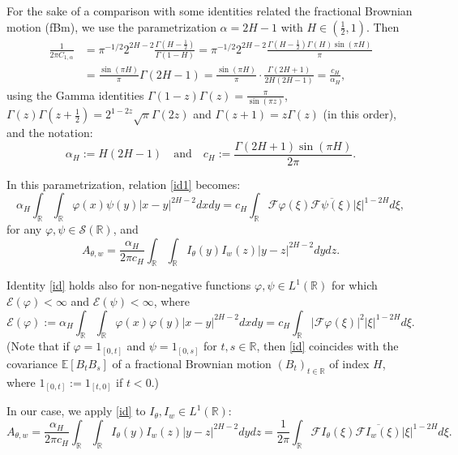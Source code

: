 \documentclass[12pt]{article}
\def\cE{\mathcal{E}}
\def\cF{\mathcal{F}}
\def\cS{\mathcal{S}}
\def\bE{\mathbb{E}}
\def\bR{\mathbb{R}}
\begin{document}
For the sake of a comparison with some identities related the fractional Brownian motion (fBm), we use the parametrization $\alpha=2H-1$ with $H \in (\frac{1}{2},1)$. 
Then 
\begin{align*}
\frac{1}{2\pi C_{1,\alpha}}&= %
\pi^{-1/2} 2^{2H-2}\frac{\Gamma(H-\frac{1}{2})}{\Gamma(1-H)}=\pi^{-1/2} 2^{2H-2}\frac{\Gamma(H-\frac{1}{2})\Gamma(H)\sin(\pi H)}{\pi}\\
&= \frac{\sin(\pi H)}{\pi}\Gamma(2H-1)=\frac{\sin(\pi H)}{\pi}\cdot \frac{\Gamma(2H+1)}{2H(2H-1)}=\frac{c_H}{\alpha_H},
\end{align*}
using the Gamma identities
$\Gamma(1-z)\Gamma(z)=\frac{\pi}{\sin(\pi z)}$, $\Gamma(z) \Gamma(z+\frac{1}{2})=2^{1-2z}\sqrt{\pi}\Gamma(2z)$ and
$\Gamma(z+1)=z\Gamma(z)$ (in this order), and the notation:
\[
\alpha_{H}:=H(2H-1) \quad \mbox{and} \quad c_H:=\frac{\Gamma(2H+1)\sin(\pi H)}{2\pi}.
\]

In this parametrization, relation \eqref{id1} becomes: 
\begin{equation}
\label{id}
\alpha_H \int_{\bR} \int_{\bR}\varphi(x)\psi(y)|x-y|^{2H-2}dxdy=c_H \int_{\bR}\cF \varphi(\xi)\overline{\cF \psi(\xi)}|\xi|^{1-2H}d\xi,
\end{equation}
for any $\varphi,\psi \in \cS(\bR)$, and
\[
A_{\theta,w}=\frac{\alpha_H}{2\pi c_H}\int_{\bR}\int_{\bR}I_{\theta}(y) I_{w}(z)|y-z|^{2H-2}dydz.
\]


Identity \eqref{id} holds also for non-negative functions $\varphi,\psi \in L^1(\bR)$ for which $\cE(\varphi)<\infty$ and $\cE(\psi)<\infty$, where
\[
\cE(\varphi):=\alpha_H\int_{\bR}\int_{\bR} \varphi(x) \varphi(y)|x-y|^{2H-2}dxdy=c_H \int_{\bR}|\cF \varphi (\xi)|^2 |\xi|^{1-2H}d\xi.
\]
(Note that if $\varphi=1_{[0,t]}$ and $\psi=1_{[0,s]}$ for $t,s\in \bR$, then \eqref{id} coincides with the covariance $\bE[B_t B_s]$ of a fractional Brownian motion $(B_t)_{t\in \bR}$ of index $H$, where $1_{[0,t]}:=1_{[t,0]}$ if $t<0$.)

\medskip

In our case, we apply \eqref{id} to $I_{\theta},I_{w} \in L^1(\bR)$:
\[
A_{\theta,w}=\frac{\alpha_H}{2\pi c_H}\int_{\bR}\int_{\bR} I_{\theta}(y)I_{w}(z)|y-z|^{2H-2} dydz=\frac{1}{2\pi}\int_{\bR}\cF I_{\theta}(\xi)\overline{\cF I_{w}(\xi)}|\xi|^{1-2H}d\xi.
\]
\end{document}

